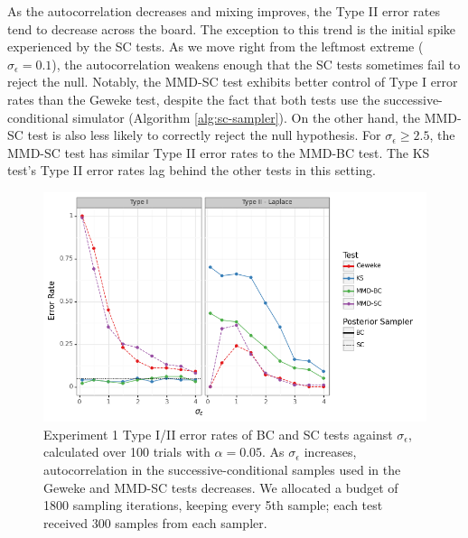 \documentclass[a4paper,11pt]{article}
\begin{document}
As the autocorrelation decreases and mixing improves, the Type II error rates tend to decrease across the board. The exception to this trend is the initial spike experienced by the SC tests. As we move right from the leftmost extreme ($\sigma_{\epsilon} = 0.1$), the autocorrelation weakens enough that the SC tests sometimes fail to reject the null. Notably, the MMD-SC test exhibits better control of Type I error rates than the Geweke test, despite the fact that both tests use the successive-conditional simulator (Algorithm \ref{alg:sc-sampler}). On the other hand, the MMD-SC test is also less likely to correctly reject the null hypothesis. For $\sigma_{\epsilon} \geq 2.5$, the MMD-SC test has similar Type II error rates to the MMD-BC test. The KS test's Type II error rates lag behind the other tests in this setting.

\begin{figure}[H]
    \centering
    \includegraphics[width=\textwidth]{figures/gandy_scott_auto.png}
    \caption{Experiment 1 Type I/II error rates of BC and SC tests against $\sigma_{\epsilon}$, calculated over 100 trials with $\alpha=0.05$. As $\sigma_{\epsilon}$ increases, autocorrelation in the successive-conditional samples used in the Geweke and MMD-SC tests decreases. We allocated a budget of 1800 sampling iterations, keeping every 5th sample; each test received 300 samples from each sampler.}
    \label{fig:ex1_auto}
\end{figure}
\end{document}
